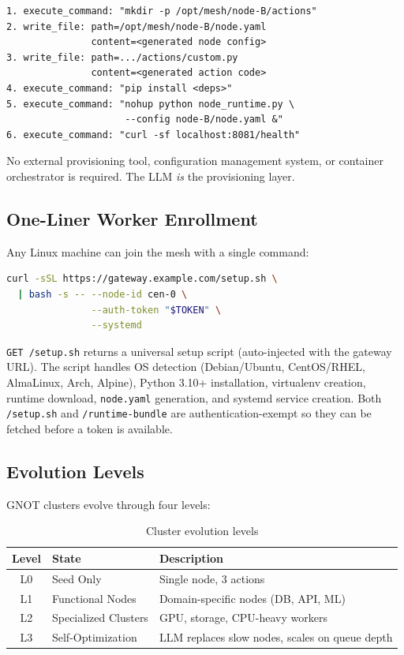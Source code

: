 \documentclass[10pt,twocolumn]{article}
\begin{document}
\begin{lstlisting}[caption={LLM-orchestrated node bootstrap sequence}]
1. execute_command: "mkdir -p /opt/mesh/node-B/actions"
2. write_file: path=/opt/mesh/node-B/node.yaml
               content=<generated node config>
3. write_file: path=.../actions/custom.py
               content=<generated action code>
4. execute_command: "pip install <deps>"
5. execute_command: "nohup python node_runtime.py \
                     --config node-B/node.yaml &"
6. execute_command: "curl -sf localhost:8081/health"
\end{lstlisting}

No external provisioning tool, configuration management system, or
container orchestrator is required. The LLM \emph{is} the provisioning
layer.

\subsection{One-Liner Worker Enrollment}

Any Linux machine can join the mesh with a single command:

\begin{lstlisting}[language=bash]
curl -sSL https://gateway.example.com/setup.sh \
  | bash -s -- --node-id cen-0 \
               --auth-token "$TOKEN" \
               --systemd
\end{lstlisting}

\texttt{GET /setup.sh} returns a universal setup script (auto-injected
with the gateway URL). The script handles OS detection (Debian/Ubuntu,
CentOS/RHEL, AlmaLinux, Arch, Alpine), Python 3.10+ installation,
virtualenv creation, runtime download, \texttt{node.yaml} generation,
and systemd service creation. Both \texttt{/setup.sh} and
\texttt{/runtime-bundle} are authentication-exempt so they can be
fetched before a token is available.

\subsection{Evolution Levels}

GNOT clusters evolve through four levels:

\begin{table}[tp]
\centering
\caption{Cluster evolution levels}
\label{tab:evolution}
\small
\begin{tabular}{@{}clp{4.0cm}@{}}
\toprule
\textbf{Level} & \textbf{State} & \textbf{Description} \\
\midrule
L0 & Seed Only & Single node, 3 actions \\
L1 & Functional Nodes & Domain-specific nodes (DB, API, ML) \\
L2 & Specialized Clusters & GPU, storage, CPU-heavy workers \\
L3 & Self-Optimization & LLM replaces slow nodes, scales on queue depth \\
\bottomrule
\end{tabular}
\end{table}
\end{document}
